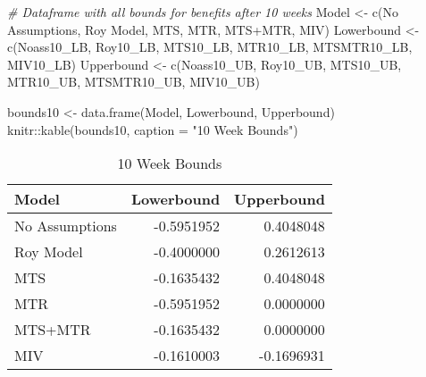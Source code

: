 \documentclass[
]{article}
\newenvironment{Shaded}{\begin{snugshade}}{\end{snugshade}}
\newcommand{\AttributeTok}[1]{\textcolor[rgb]{0.77,0.63,0.00}{#1}}
\newcommand{\CommentTok}[1]{\textcolor[rgb]{0.56,0.35,0.01}{\textit{#1}}}
\newcommand{\FunctionTok}[1]{\textcolor[rgb]{0.00,0.00,0.00}{#1}}
\newcommand{\NormalTok}[1]{#1}
\newcommand{\OtherTok}[1]{\textcolor[rgb]{0.56,0.35,0.01}{#1}}
\newcommand{\SpecialCharTok}[1]{\textcolor[rgb]{0.00,0.00,0.00}{#1}}
\newcommand{\StringTok}[1]{\textcolor[rgb]{0.31,0.60,0.02}{#1}}
\begin{document}
\begin{Shaded}
\begin{Highlighting}[]
\CommentTok{\# Dataframe with all bounds for benefits after 10 weeks}
\NormalTok{Model }\OtherTok{\textless{}{-}} \FunctionTok{c}\NormalTok{(}\StringTok{\textquotesingle{}No Assumptions\textquotesingle{}}\NormalTok{, }\StringTok{\textquotesingle{}Roy Model\textquotesingle{}}\NormalTok{, }\StringTok{\textquotesingle{}MTS\textquotesingle{}}\NormalTok{, }\StringTok{\textquotesingle{}MTR\textquotesingle{}}\NormalTok{, }\StringTok{\textquotesingle{}MTS+MTR\textquotesingle{}}\NormalTok{, }\StringTok{\textquotesingle{}MIV\textquotesingle{}}\NormalTok{)}
\NormalTok{Lowerbound }\OtherTok{\textless{}{-}} \FunctionTok{c}\NormalTok{(Noass10\_LB, Roy10\_LB, MTS10\_LB, MTR10\_LB, MTSMTR10\_LB, MIV10\_LB)}
\NormalTok{Upperbound }\OtherTok{\textless{}{-}} \FunctionTok{c}\NormalTok{(Noass10\_UB, Roy10\_UB, MTS10\_UB, MTR10\_UB, MTSMTR10\_UB, MIV10\_UB)}

\NormalTok{bounds10 }\OtherTok{\textless{}{-}} \FunctionTok{data.frame}\NormalTok{(Model, Lowerbound, Upperbound)}
\NormalTok{knitr}\SpecialCharTok{::}\FunctionTok{kable}\NormalTok{(bounds10, }\AttributeTok{caption =} \StringTok{"10 Week Bounds"}\NormalTok{)}
\end{Highlighting}
\end{Shaded}

\begin{table}

\caption{\label{tab:unnamed-chunk-8}10 Week Bounds}
\centering
\begin{tabular}[t]{l|r|r}
\hline
Model & Lowerbound & Upperbound\\
\hline
No Assumptions & -0.5951952 & 0.4048048\\
\hline
Roy Model & -0.4000000 & 0.2612613\\
\hline
MTS & -0.1635432 & 0.4048048\\
\hline
MTR & -0.5951952 & 0.0000000\\
\hline
MTS+MTR & -0.1635432 & 0.0000000\\
\hline
MIV & -0.1610003 & -0.1696931\\
\hline
\end{tabular}
\end{table}
\end{document}
